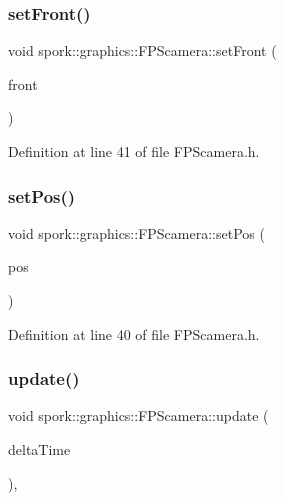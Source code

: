 \subsubsection{\texorpdfstring{set\+Front()}{setFront()}}
{\footnotesize\ttfamily void spork\+::graphics\+::\+F\+P\+Scamera\+::set\+Front (\begin{DoxyParamCaption}\item[{\hyperlink{structspork_1_1maths_1_1vec3}{maths\+::vec3}}]{front }\end{DoxyParamCaption})\hspace{0.3cm}{\ttfamily [inline]}}



Definition at line 41 of file F\+P\+Scamera.\+h.

\mbox{\label{classspork_1_1graphics_1_1_f_p_scamera_a3a749cd21effcc234f433518c4390be8}} 
\subsubsection{\texorpdfstring{set\+Pos()}{setPos()}}
{\footnotesize\ttfamily void spork\+::graphics\+::\+F\+P\+Scamera\+::set\+Pos (\begin{DoxyParamCaption}\item[{\hyperlink{structspork_1_1maths_1_1vec3}{maths\+::vec3}}]{pos }\end{DoxyParamCaption})\hspace{0.3cm}{\ttfamily [inline]}}



Definition at line 40 of file F\+P\+Scamera.\+h.

\mbox{\label{classspork_1_1graphics_1_1_f_p_scamera_afbb0ac172ef7ab075cc5ff2131c203b3}} 
\subsubsection{\texorpdfstring{update()}{update()}}
{\footnotesize\ttfamily void spork\+::graphics\+::\+F\+P\+Scamera\+::update (\begin{DoxyParamCaption}\item[{G\+Lfloat}]{delta\+Time }\end{DoxyParamCaption})\hspace{0.3cm}{\ttfamily [override]}, {\ttfamily [virtual]}}



